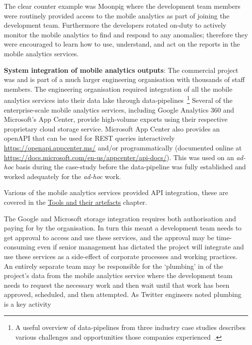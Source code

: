The clear counter example was Moonpig where the development team members were routinely provided access to the mobile analytics as part of joining the development team. Furthermore the developers rotated on-duty to actively monitor the mobile analytics to find and respond to any anomalies; therefore they were encouraged to learn how to use, understand, and act on the reports in the mobile analytics services.

\textbf{System integration of mobile analytics outputs}: 
The commercial project was and is part of a much larger engineering organisation with thousands of staff members. The engineering organisation required integration of all the mobile analytics services into their data lake through data-pipelines~\footnote{A useful overview of data-pipelines from three industry case studies describes various challenges and opportunities those companies experienced~\citep{munappy2020_data_pipeline_management_in_practice_challenges_and_opportunities}.} Several of the enterprise-scale mobile analytics services, including Google Analytics 360 and Microsoft's App Center, provide high-volume exports using their respective proprietary cloud storage service. Microsoft App Center also provides an openAPI that can be used for REST queries interactively \url{https://openapi.appcenter.ms/} and/or programmatically (documented online at \url{https://docs.microsoft.com/en-us/appcenter/api-docs/}). This was used on an \emph{ad-hoc} basis during the case-study before the data-pipeline was fully established and worked adequately for the \emph{ad-hoc} work.  

Various of the mobile analytics services provided API integration, these are covered in the \href{chapter-tools-and-their-artefacts}{Tools and their artefacts} chapter.

The Google and Microsoft storage integration requires both authorisation and paying for by the organisation. In turn this meant a development team needs to get approval to access and use these services, and the approval may be time-consuming even if senior management has dictated the project will integrate and use these services as a side-effect of corporate processes and working practices. An entirely separate team may be responsible for the `plumbing' in of the project's data from the mobile analytics service where the development team needs to request the necessary work and then wait until that work has been approved, scheduled, and then attempted. As Twitter engineers noted plumbing is a key activity~\citep[page 6]{lin2013_scaling_big_data_mining_infrastructure_the_twitter_experience} 


